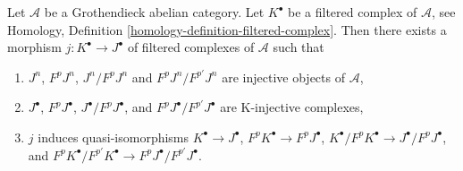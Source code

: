 \begin{lemma}
\label{lemma-K-injective-embedding-filtration}
Let $\mathcal{A}$ be a Grothendieck abelian category.
Let $K^\bullet$ be a filtered complex of $\mathcal{A}$, see
Homology, Definition \ref{homology-definition-filtered-complex}.
Then there exists a morphism $j : K^\bullet \to J^\bullet$
of filtered complexes of $\mathcal{A}$ such that
\begin{enumerate}
\item $J^n$, $F^pJ^n$, $J^n/F^pJ^n$ and $F^pJ^n/F^{p'}J^n$ are injective
objects of $\mathcal{A}$,
\item $J^\bullet$, $F^pJ^\bullet$, $J^\bullet/F^pJ^\bullet$, and
$F^pJ^\bullet/F^{p'}J^\bullet$ are K-injective complexes,
\item $j$ induces quasi-isomorphisms
$K^\bullet \to J^\bullet$,
$F^pK^\bullet \to F^pJ^\bullet$,
$K^\bullet/F^pK^\bullet \to J^\bullet/F^pJ^\bullet$, and
$F^pK^\bullet/F^{p'}K^\bullet \to F^pJ^\bullet/F^{p'}J^\bullet$.
\end{enumerate}
\end{lemma}

